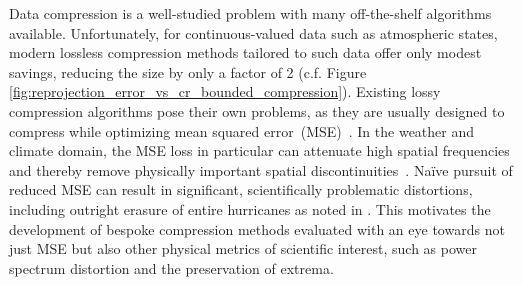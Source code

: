 Data compression is a well-studied problem with many off-the-shelf algorithms available. Unfortunately, for continuous-valued data such as atmospheric states, modern lossless compression methods tailored to such data offer only modest savings, reducing the size by only a factor of 2  (c.f. Figure \ref{fig:reprojection_error_vs_cr_bounded_compression}). Existing lossy compression algorithms pose their own problems, as they are usually designed to compress while optimizing mean squared error~(MSE)~\citep{sz3_algo}.
In the weather and climate domain, the MSE loss in particular can attenuate high spatial frequencies and thereby remove physically important spatial discontinuities~\citep{ravuri2021nowcasting}. %
%
Na\"ive pursuit of reduced MSE can result in significant, scientifically problematic distortions, including outright erasure of entire hurricanes as noted in \cite{huang2022compressing}. This motivates the development of bespoke compression methods evaluated with an eye towards not just MSE but also other physical metrics of scientific interest, such as power spectrum distortion and the preservation of extrema.



